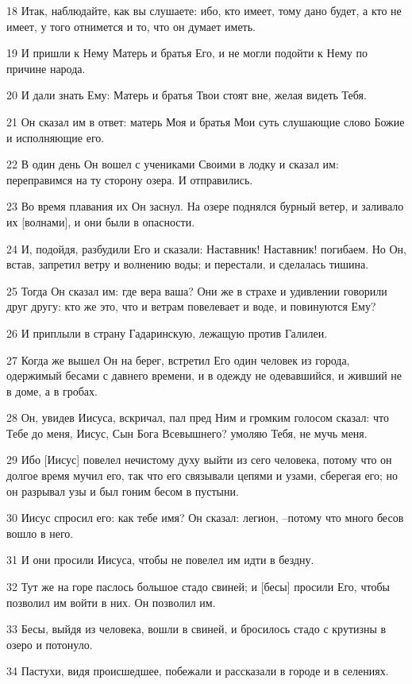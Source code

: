 \par 18 Итак, наблюдайте, как вы слушаете: ибо, кто имеет, тому дано будет, а кто не имеет, у того отнимется и то, что он думает иметь.
\par 19 И пришли к Нему Матерь и братья Его, и не могли подойти к Нему по причине народа.
\par 20 И дали знать Ему: Матерь и братья Твои стоят вне, желая видеть Тебя.
\par 21 Он сказал им в ответ: матерь Моя и братья Мои суть слушающие слово Божие и исполняющие его.
\par 22 В один день Он вошел с учениками Своими в лодку и сказал им: переправимся на ту сторону озера. И отправились.
\par 23 Во время плавания их Он заснул. На озере поднялся бурный ветер, и заливало их [волнами], и они были в опасности.
\par 24 И, подойдя, разбудили Его и сказали: Наставник! Наставник! погибаем. Но Он, встав, запретил ветру и волнению воды; и перестали, и сделалась тишина.
\par 25 Тогда Он сказал им: где вера ваша? Они же в страхе и удивлении говорили друг другу: кто же это, что и ветрам повелевает и воде, и повинуются Ему?
\par 26 И приплыли в страну Гадаринскую, лежащую против Галилеи.
\par 27 Когда же вышел Он на берег, встретил Его один человек из города, одержимый бесами с давнего времени, и в одежду не одевавшийся, и живший не в доме, а в гробах.
\par 28 Он, увидев Иисуса, вскричал, пал пред Ним и громким голосом сказал: что Тебе до меня, Иисус, Сын Бога Всевышнего? умоляю Тебя, не мучь меня.
\par 29 Ибо [Иисус] повелел нечистому духу выйти из сего человека, потому что он долгое время мучил его, так что его связывали цепями и узами, сберегая его; но он разрывал узы и был гоним бесом в пустыни.
\par 30 Иисус спросил его: как тебе имя? Он сказал: легион, --потому что много бесов вошло в него.
\par 31 И они просили Иисуса, чтобы не повелел им идти в бездну.
\par 32 Тут же на горе паслось большое стадо свиней; и [бесы] просили Его, чтобы позволил им войти в них. Он позволил им.
\par 33 Бесы, выйдя из человека, вошли в свиней, и бросилось стадо с крутизны в озеро и потонуло.
\par 34 Пастухи, видя происшедшее, побежали и рассказали в городе и в селениях.
